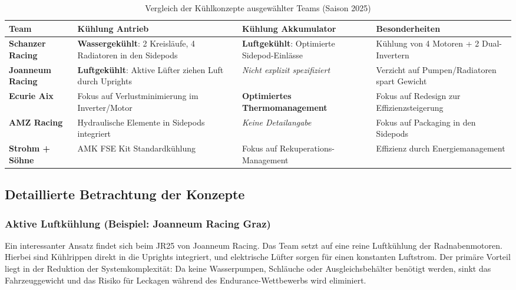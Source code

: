 \begin{table}[h]
    \centering
    \caption{Vergleich der Kühlkonzepte ausgewählter Teams (Saison 2025)}
    \label{tab:kuehlung_benchmark}
    \begin{tabular}{l|p{4cm}|p{4cm}|p{3.5cm}}
        \hline
        \textbf{Team} & \textbf{Kühlung Antrieb} & \textbf{Kühlung Akkumulator} & \textbf{Besonderheiten} \\ \hline
        \textbf{Schanzer Racing} & \textbf{Wassergekühlt}: 2 Kreisläufe, 4 Radiatoren in den Sidepods & \textbf{Luftgekühlt}: Optimierte Sidepod-Einlässe & Kühlung von 4 Motoren + 2 Dual-Invertern \\ \hline
        \textbf{Joanneum Racing} & \textbf{Luftgekühlt}: Aktive Lüfter ziehen Luft durch Uprights & \textit{Nicht explizit spezifiziert} & Verzicht auf Pumpen/Radiatoren spart Gewicht \\ \hline
        \textbf{Ecurie Aix}      & Fokus auf Verlustminimierung im Inverter/Motor & \textbf{Optimiertes Thermomanagement} & Fokus auf Redesign zur Effizienzsteigerung \\ \hline
        \textbf{AMZ Racing}      & Hydraulische Elemente in Sidepods integriert & \textit{Keine Detailangabe} & Fokus auf Packaging in den Sidepods \\ \hline
        \textbf{Strohm + Söhne}  & AMK FSE Kit Standardkühlung & Fokus auf Rekuperations-Management & Effizienz durch Energiemanagement \\ \hline
    \end{tabular}
\end{table}

\subsection{Detaillierte Betrachtung der Konzepte}

\subsubsection{Aktive Luftkühlung (Beispiel: Joanneum Racing Graz)}
Ein interessanter Ansatz findet sich beim JR25 von Joanneum Racing. Das Team setzt auf eine reine Luftkühlung der Radnabenmotoren. Hierbei sind Kühlrippen direkt in die Uprights integriert, und elektrische Lüfter sorgen für einen konstanten Luftstrom. Der primäre Vorteil liegt in der Reduktion der Systemkomplexität: Da keine Wasserpumpen, Schläuche oder Ausgleichsbehälter benötigt werden, sinkt das Fahrzeuggewicht und das Risiko für Leckagen während des Endurance-Wettbewerbs wird eliminiert.


